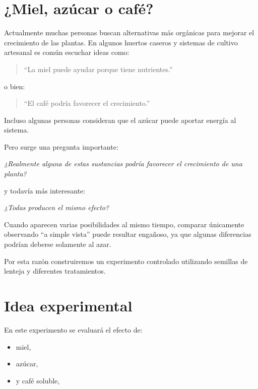 \documentclass[compacto,10pt,comentarios]{aleph-notas}
\begin{document}
\encabezado

\section{¿Miel, azúcar o café?}

Actualmente muchas personas buscan alternativas más orgánicas para mejorar el crecimiento de las plantas. En algunos huertos caseros y sistemas de cultivo artesanal es común escuchar ideas como:

\begin{quote}
“La miel puede ayudar porque tiene nutrientes.”
\end{quote}

o bien:

\begin{quote}
“El café podría favorecer el crecimiento.”
\end{quote}

Incluso algunas personas consideran que el azúcar puede aportar energía al sistema.

Pero surge una pregunta importante:

\begin{center}
\textit{¿Realmente alguna de estas sustancias podría favorecer el crecimiento de una planta?}
\end{center}

y todavía más interesante:

\begin{center}
\textit{¿Todas producen el mismo efecto?}
\end{center}

Cuando aparecen varias posibilidades al mismo tiempo, comparar únicamente observando “a simple vista” puede resultar engañoso, ya que algunas diferencias podrían deberse solamente al azar.

Por esta razón construiremos un experimento controlado utilizando semillas de lenteja y diferentes tratamientos.

\section{Idea experimental}

En este experimento se evaluará el efecto de:

\begin{itemize}
\item miel,
\item azúcar,
\item y café soluble,
\end{itemize}
\end{document}
